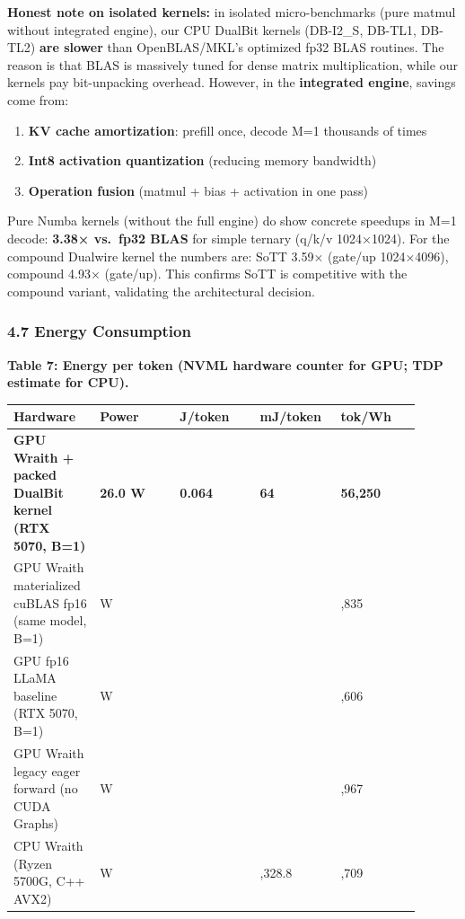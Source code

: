 \textbf{Honest note on isolated kernels:} in isolated micro-benchmarks
(pure matmul without integrated engine), our CPU DualBit kernels
(DB-I2\_S, DB-TL1, DB-TL2) \textbf{are slower} than OpenBLAS/MKL's
optimized fp32 BLAS routines. The reason is that BLAS is massively tuned
for dense matrix multiplication, while our kernels pay bit-unpacking
overhead. However, in the \textbf{integrated engine}, savings come from:

\begin{enumerate}
\def\labelenumi{\arabic{enumi}.}
\tightlist
\item
  \textbf{KV cache amortization}: prefill once, decode M=1 thousands of
  times
\item
  \textbf{Int8 activation quantization} (reducing memory bandwidth)
\item
  \textbf{Operation fusion} (matmul + bias + activation in one pass)
\end{enumerate}

Pure Numba kernels (without the full engine) do show concrete speedups
in M=1 decode: \textbf{3.38× vs.~fp32 BLAS} for simple ternary (q/k/v
1024×1024). For the compound Dualwire kernel the numbers are: SoTT 3.59×
(gate/up 1024×4096), compound 4.93× (gate/up). This confirms SoTT is
competitive with the compound variant, validating the architectural
decision.

\subsubsection{4.7 Energy Consumption}\label{energy-consumption}

\textbf{Table 7: Energy per token (NVML hardware counter for GPU; TDP
estimate for CPU).}

{\def\LTcaptype{none} %
{\footnotesize\setlength{\tabcolsep}{3pt}
\begin{longtable}[]{@{}>{\raggedright\arraybackslash}p{0.180\linewidth}>{\raggedright\arraybackslash}p{0.180\linewidth}>{\raggedright\arraybackslash}p{0.180\linewidth}>{\raggedright\arraybackslash}p{0.180\linewidth}>{\raggedright\arraybackslash}p{0.180\linewidth}@{}}
\toprule\noalign{}
Hardware & Power & J/token & mJ/token & tok/Wh \\
\midrule\noalign{}
\endhead
\bottomrule\noalign{}
\endlastfoot
\textbf{GPU Wraith + packed DualBit kernel (RTX 5070, B=1)} &
\textbf{26.0 W} & \textbf{0.064} & \textbf{64} & \textbf{56,250} \\
GPU Wraith materialized cuBLAS fp16 (same model, B=1) & 38.8 W & 0.084 &
84 & 42,835 \\
GPU fp16 LLaMA baseline (RTX 5070, B=1) & 112.6 W & 0.286 & 285.6 &
12,606 \\
GPU Wraith legacy eager forward (no CUDA Graphs) & 109.9 W & 0.278 &
277.6 & 12,967 \\
CPU Wraith (Ryzen 5700G, C++ AVX2) & 65.0 W & 1.329 & 1,328.8 & 2,709 \\
\end{longtable}
}
}

